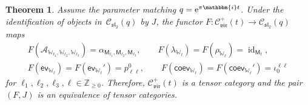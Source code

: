 \documentclass[pdftex]{sigma}
\numberwithin{equation}{section}
\newtheorem{thm}{Theorem}[section]
\newcommand{\id}{\operatorname{id}}
\newcommand{\bZ}{\mathbb{Z}}
\newcommand{\cA}{\mathcal{A}}
\newcommand{\cC}{\mathcal{C}}
\newcommand{\fsl}{\mathfrak{sl}}
\newcommand{\sfM}{\mathsf{M}}
\newcommand{\bbmi}{\mathbbm{i}}
\newcommand{\QGirrep}[1]{\sfM_{#1}}
\newcommand{\CGemb}[3]{\iota_{#1}^{#2 #3}}
\newcommand{\CGproj}[3]{p^{#1}_{#2 #3}}
\newcommand{\catQG}{\cC_{\fsl_{2}}}
\newcommand{\catVir}{\cC_{\vir}}
\newcommand{\virmod}{\mathbb{W}}
\newcommand{\vir}{\mathfrak{vir}}
\newcommand{\ev}{\mathsf{ev}}
\newcommand{\coev}{\mathsf{coev}}
\begin{document}
\begin{thm}
\label{thm:equivalence_vir_QG}
Assume the parameter matching $q={\rm e}^{\pi\bbmi t}$.
Under the identification of objects in~$\catQG (q)$ by $J$, the functor $F\colon \catVir^{+}(t) \to \catQG(q)$ maps
\begin{gather*}
	F(\cA_{\virmod_{\ell_{1}},\virmod_{\ell_{2}},\virmod_{\ell_{3}}}) = \alpha_{\QGirrep{\ell_{1}},\QGirrep{\ell_{2}},\QGirrep{\ell_{3}}}, \qquad
	F(\lambda_{\virmod_{\ell}}) = F(\rho_{\virmod_{\ell}}) = \id_{\QGirrep{\ell}}, \\
	F(\ev_{\virmod_{\ell}}) = F(\ev_{\virmod_{\ell}}') = \CGproj{0}{\ell}{\ell},\qquad
	F(\coev_{\virmod_{\ell}}) = F(\coev_{\virmod_{\ell}}') = \CGemb{0}{\ell}{\ell}
\end{gather*}
for $\ell_{1},\ell_{2},\ell_{3},\ell\in \bZ_{\geq 0}$.
Therefore, $\catVir^{+}(t)$ is a tensor category and the pair $(F,J)$ is an equivalence of tensor categories.
\end{thm}
\end{document}

